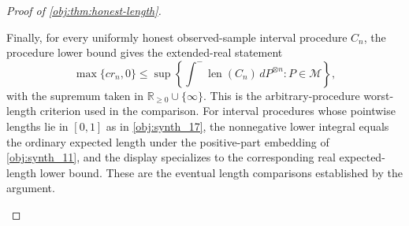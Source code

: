 \documentclass[11pt]{article}
\begin{document}
\begin{proof}[Proof of \cref{obj:thm:honest-length}]
\begin{enumerate}
Finally, for every uniformly honest observed-sample interval procedure \(C_n\), the procedure lower
bound gives the extended-real statement
\[
\max\{c r_n,0\}
\le
\sup\left\{
\int^{-}\operatorname{len}(C_n)\,dP^{\otimes n}: P\in\mathcal M
\right\},
\]
with the supremum taken in \(\mathbb R_{\ge0}\cup\{\infty\}\). This is the arbitrary-procedure worst-length criterion used in the comparison. For interval procedures whose pointwise lengths lie in \([0,1]\) as in \cref{obj:synth_17}, the nonnegative lower integral equals the ordinary expected length under the positive-part embedding of \cref{obj:synth_11}, and the display specializes to the corresponding real expected-length lower bound.
These are the eventual length comparisons established by the argument.
\end{enumerate}
\end{proof}
\end{document}
